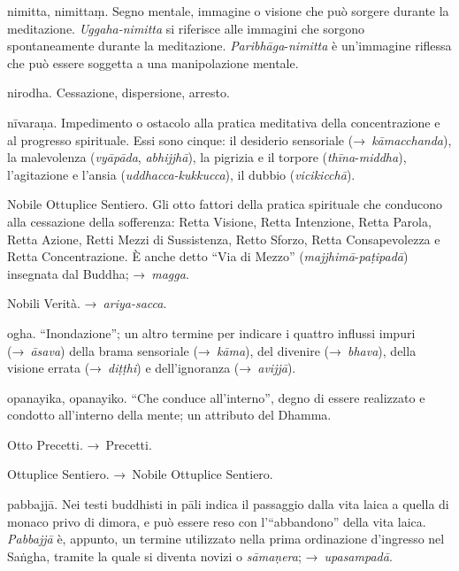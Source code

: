 \begin{glossarydescription}
\item[nimitta, nimittaṃ.] Segno mentale, immagine o visione che può
  sorgere durante la meditazione. \emph{Uggaha-nimitta} si riferisce alle
  immagini che sorgono spontaneamente durante la meditazione.
  \emph{Paribhāga}-\emph{nimitta} è un'immagine riflessa che può essere soggetta
  a una manipolazione mentale.

\item[nirodha.] Cessazione, dispersione, arresto.

\item[nīvaraṇa.] Impedimento o ostacolo alla pratica meditativa della
  concentrazione e al progresso spirituale. Essi sono cinque: il desiderio
  sensoriale (→~\emph{kāmacchanda}), la malevolenza (\emph{vyāpāda},
  \emph{abhijjhā}), la pigrizia e il torpore (\emph{thīna}-\emph{middha}),
  l'agitazione e l'ansia (\emph{uddhacca-kukkucca}), il dubbio
  (\emph{vicikicchā}).

\item[Nobile Ottuplice Sentiero.]\label{glossary-ottuplice} Gli otto fattori della pratica spirituale che
  conducono alla cessazione della sofferenza: Retta Visione, Retta Intenzione,
  Retta Parola, Retta Azione, Retti Mezzi di Sussistenza, Retto Sforzo, Retta
  Consapevolezza e Retta Concentrazione. È anche detto ``Via di Mezzo''
  (\emph{majjhimā}-\emph{paṭipadā}) insegnata dal Buddha; →~\emph{magga}.

\item[Nobili Verità.] →~\emph{ariya-sacca}.


\item[ogha.] ``Inondazione''; un altro termine per indicare i quattro
  influssi impuri (→~\emph{āsava}) della brama sensoriale (→~\emph{kāma}), del
  divenire (→~\emph{bhava}), della visione errata (→~\emph{diṭṭhi}) e
  dell'ignoranza (→~\emph{avijjā}).

\item[opanayika, opanayiko.] ``Che conduce all'interno'', degno di essere
  realizzato e condotto all'interno della mente; un attributo del Dhamma.

\item[Otto Precetti.] →~Precetti.

\item[Ottuplice Sentiero.] →~Nobile Ottuplice Sentiero.


\item[pabbajjā.] Nei testi buddhisti in pāli indica il passaggio dalla
  vita laica a quella di monaco privo di dimora, e può essere reso con
  l'``abbandono'' della vita laica. \emph{Pabbajjā} è, appunto, un termine
  utilizzato nella prima ordinazione d'ingresso nel Saṅgha, tramite la quale si
  diventa novizi o \emph{sāmaṇera}; →~\emph{upasampadā}.


\end{glossarydescription}
